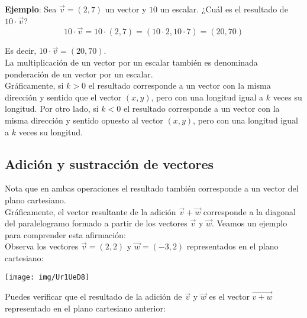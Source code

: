 \noindent \textbf{Ejemplo}: Sea $\vec{v}= (2,7)$ un vector y $10$ un escalar. ¿Cuál es el resultado de $10\cdot \vec v$?\\

$$10\cdot \vec{v} = 10\cdot (2,7)=(10\cdot 2, 10\cdot 7)=(20,70)$$

\noindent Es decir, $10\cdot \vec v=(20,70)$.\\

\noindent La multiplicación de un vector por un escalar también es denominada ponderación de un vector por un escalar. \\

\noindent Gráficamente, si $k>0$ el resultado corresponde a un vector con la misma dirección y sentido que el vector $(x,y)$, pero con una longitud igual a $k$ veces su longitud. Por otro lado, si $k<0$ el resultado corresponde a un vector con la misma dirección y sentido opuesto al vector $(x,y)$, pero con una longitud igual a $k$ veces su longitud.


\subsection{Adición y sustracción de vectores}


\noindent Nota que en ambas operaciones el resultado también corresponde a un vector del plano cartesiano.\\

\noindent Gráficamente, el vector resultante de la adición $\vec{v}+\vec{w}$ corresponde a la diagonal del paralelogramo formado a partir de los vectores $\vec{v}$  y  $\vec{w}$. Veamos un ejemplo para comprender esta afirmación: \\

\noindent Observa los vectores $\vec{v}=(2,2)$  y  $\vec{w}=(-3,2)$ representados en el plano cartesiano:

\begin{center}
	\texttt{[image: img/Ur1UeD8]}
\end{center}

\noindent Puedes verificar que el resultado de la adición de $\vec{v}$  y $\vec{w}$ es el vector $\overrightarrow{v+w}$ representado en el plano cartesiano anterior:

